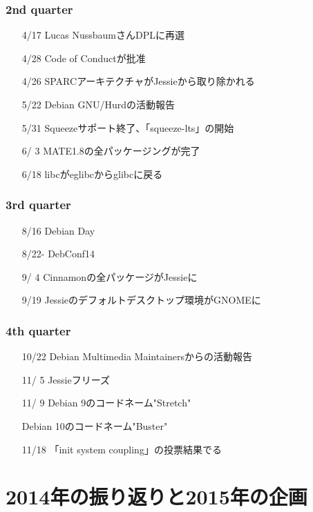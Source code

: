 \documentclass[cjk,dvipdfmx,10pt,compress,%
hyperref={bookmarks=true,bookmarksnumbered=true,bookmarksopen=false,%
colorlinks=false,%
pdftitle={第 92 回 関西 Debian 勉強会},%
pdfauthor={倉敷・のがた・佐々木・かわだ},%
pdfsubject={資料},%
}]{beamer}
\begin{document}
\begin{frame}[fragile]
  \frametitle{2nd quarter}
  \begin{itemize}
  \item[4/17] Lucas NussbaumさんDPLに再選
  \item[4/28] Code of Conductが批准
  \item[4/26] SPARCアーキテクチャがJessieから取り除かれる
  \item[5/22] Debian GNU/Hurdの活動報告
  \item[5/31] Squeezeサポート終了、「squeeze-lts」の開始
  \item[6/ 3] MATE1.8の全パッケージングが完了
  \item[6/18] libcがeglibcからglibcに戻る
  \end{itemize}
\end{frame}

\begin{frame}[fragile]
  \frametitle{3rd quarter}
  \begin{itemize}
  \item[8/16] Debian Day
  \item[8/22-] DebConf14
  \item[9/ 4] Cinnamonの全パッケージがJessieに
  \item[9/19] Jessieのデフォルトデスクトップ環境がGNOMEに
  \end{itemize}
\end{frame}

\begin{frame}[fragile]
  \frametitle{4th quarter}
  \begin{itemize}
  \item[10/22] Debian Multimedia Maintainersからの活動報告
  \item[11/ 5] Jessieフリーズ
  \item[11/ 9] Debian 9のコードネーム"Stretch"

    Debian 10のコードネーム"Buster"
    
  \item[11/18] 「init system coupling」の投票結果でる
  \end{itemize}
\end{frame}


\section{2014年の振り返りと2015年の企画}
\end{document}
